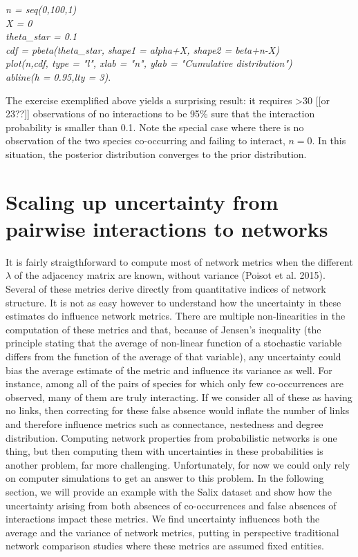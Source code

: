 \documentclass[12pt]{article}
\begin{document}
  \vspace{12pt}
\noindent\emph{
    \noindent n = seq(0,100,1)
    \\\noindent X = 0
    \\\noindent theta\_star = 0.1
    \\\noindent cdf = pbeta(theta\_star, shape1 = alpha+X, shape2 = beta+n-X)
    \\\noindent plot(n,cdf, type = "l", xlab = "n", ylab = "Cumulative distribution")
    \\\noindent abline(h = 0.95,lty = 3)}.
  \vspace{12pt}

The exercise exemplified above yields a surprising result: it requires \textgreater30 [[or 23??]] observations of no interactions to be 95\% sure that the interaction probability is smaller than 0.1. Note the special case where there is no observation of the two species co-occurring and failing to interact, $n = 0$. In this situation, the posterior distribution converges to the prior distribution. 


\section*{Scaling up uncertainty from pairwise interactions to networks}

It is fairly straigthforward to compute most of network metrics when the different $\lambda$ of the adjacency matrix are known, without variance (Poisot et al. 2015). Several of these metrics derive directly from quantitative indices of network structure. It is not as easy however to understand how the uncertainty in these estimates do influence network metrics. There are multiple non-linearities in the computation of these metrics and that, because of Jensen's inequality (the principle stating that the average of non-linear function of a stochastic variable differs from the function of the average of that variable), any uncertainty could bias the average estimate of the metric and influence its variance as well. For instance, among all of the pairs of species for which only few co-occurrences are observed, many of them are truly interacting. If we consider all of these as having no links, then correcting for these false absence would inflate the number of links and therefore influence metrics such as connectance, nestedness and degree distribution. Computing network properties from probabilistic networks is one thing, but then computing them with uncertainties in these probabilities is another problem, far more challenging. Unfortunately, for now we could only rely on computer simulations to get an answer to this problem. In the following section, we will provide an example with the Salix dataset and show how the uncertainty arising from both absences of co-occurrences and false absences of interactions impact these metrics. We find uncertainty influences both the average and the variance of network metrics, putting in perspective traditional network comparison studies where these metrics are assumed fixed entities. 
\end{document}
